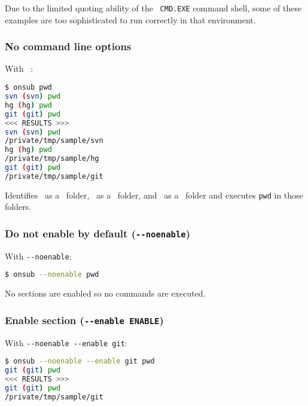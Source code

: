 Due to the limited quoting ability of the \Windows\ \lstinline{CMD.EXE} command shell, some of these examples are too sophisticated to run correctly in that environment.

\subsubsection*{No command line options}

With \lstinline{ }:

\begin{snugshade}
\begin{lstlisting}[language=bash]
$ onsub pwd
svn (svn) pwd
hg (hg) pwd
git (git) pwd
<<< RESULTS >>>
svn (svn) pwd
/private/tmp/sample/svn
hg (hg) pwd
/private/tmp/sample/hg
git (git) pwd
/private/tmp/sample/git
\end{lstlisting}
\end{snugshade}
	
Identifies \svn\ as a \Subversion\ folder, \hg\ as a \Mercurial\ folder, and \git\ as a \Git\ folder and executes \lstinline{pwd} in those folders.

\subsubsection*{Do not enable by default (\lstinline{--noenable})}

With \lstinline{--noenable}:

\begin{snugshade}
\begin{lstlisting}[language=bash]
$ onsub --noenable pwd
\end{lstlisting}
\end{snugshade}
	
No sections are enabled so no commands are executed.

\subsubsection*{Enable section (\lstinline{--enable ENABLE})}

With \lstinline{--noenable --enable git}:

\begin{snugshade}
\begin{lstlisting}[language=bash]
$ onsub --noenable --enable git pwd
git (git) pwd
<<< RESULTS >>>
git (git) pwd
/private/tmp/sample/git
\end{lstlisting}
\end{snugshade}

